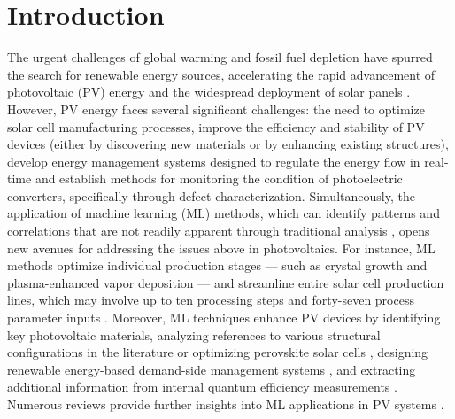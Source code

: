 \documentclass[a4paper,fleqn]{cas-sc}
\begin{document}
\section{Introduction}%
\par
The urgent challenges of global warming and fossil fuel depletion have spurred the search
for renewable energy sources, accelerating the rapid advancement of photovoltaic (PV) energy and the widespread deployment of solar panels \cite{Pata2024, Holechek2022}.
However, PV energy faces several significant challenges:
the need to optimize solar cell manufacturing processes,
improve the efficiency and stability of PV devices
(either by discovering new materials or by enhancing existing structures),
develop energy management systems designed to regulate the energy flow in real-time and
establish methods for monitoring the condition of photoelectric converters, specifically through defect characterization.
Simultaneously, the application of machine learning (ML) methods,
which can identify patterns and correlations that are not readily apparent through traditional analysis \cite{Park2022},
opens new avenues for addressing the issues above in photovoltaics.
For instance, ML methods optimize individual production stages ---
such as crystal growth \cite{Qi2020} and plasma-enhanced vapor deposition \cite{Rachdi2021} ---
and streamline entire solar cell production lines, which may involve up to ten processing steps and forty-seven process parameter inputs \cite{Buratti2020}.
Moreover, ML techniques enhance PV devices by identifying key photovoltaic materials,
analyzing references to various structural configurations in the literature \cite{Zhang2022} or
optimizing perovskite solar cells \cite{Liu2023},
designing renewable energy-based demand-side management systems \cite{Asghar2023},
and extracting additional information from internal quantum efficiency measurements \cite{AbdullahVetter2025}.
Numerous reviews provide further insights into ML applications in PV systems \cite{DiSabatino2024, Datta2023, Jaiswal2023, Buratti2024, Bhatti2023}.
\end{document}
